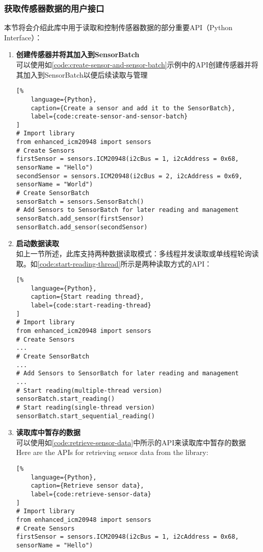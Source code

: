 \subsubsection{获取传感器数据的用户接口}
本节将会介绍此库中用于读取和控制传感器数据的部分重要API（Python Interface）：
\begin{enumerate}[label=(\alph*)]
    \item {\bfseries 创建传感器并将其加入到SensorBatch} \\
可以使用如\autoref{code:create-sensor-and-sensor-batch}示例中的API创建传感器并将其加入到SensorBatch以便后续读取与管理
\begin{lstlisting}[%
    language={Python},
    caption={Create a sensor and add it to the SensorBatch},
    label={code:create-sensor-and-sensor-batch}
]
# Import library
from enhanced_icm20948 import sensors
# Create Sensors
firstSensor = sensors.ICM20948(i2cBus = 1, i2cAddress = 0x68, sensorName = "Hello")
secondSensor = sensors.ICM20948(i2cBus = 2, i2cAddress = 0x69, sensorName = "World")
# Create SensorBatch
sensorBatch = sensors.SensorBatch()
# Add Sensors to SensorBatch for later reading and management
sensorBatch.add_sensor(firstSensor)
sensorBatch.add_sensor(secondSensor)
\end{lstlisting}
    \item {\bfseries 启动数据读取} \\
如上一节所述，此库支持两种数据读取模式：多线程并发读取或单线程轮询读取。如\autoref{code:start-reading-thread}所示是两种读取方式的API：
\begin{lstlisting}[%
    language={Python},
    caption={Start reading thread},
    label={code:start-reading-thread}
]
# Import library
from enhanced_icm20948 import sensors
# Create Sensors
...
# Create SensorBatch
...
# Add Sensors to SensorBatch for later reading and management
...
# Start reading(multiple-thread version)
sensorBatch.start_reading()
# Start reading(single-thread version)
sensorBatch.start_sequential_reading()
\end{lstlisting}
    \item {\bfseries 读取库中暂存的数据} \\
可以使用如\autoref{code:retrieve-sensor-data}中所示的API来读取库中暂存的数据
Here are the APIs for retrieving sensor data from the library:
\begin{lstlisting}[%
    language={Python},
    caption={Retrieve sensor data},
    label={code:retrieve-sensor-data}
]
# Import library
from enhanced_icm20948 import sensors
# Create Sensors
firstSensor = sensors.ICM20948(i2cBus = 1, i2cAddress = 0x68, sensorName = "Hello")

\end{lstlisting}
\end{enumerate}
